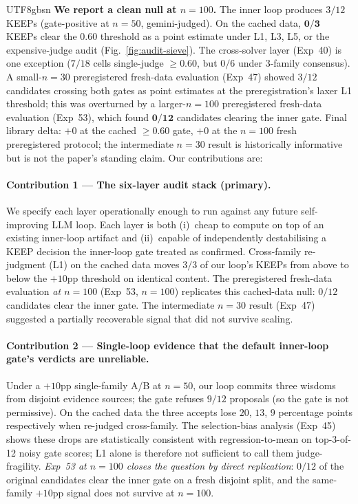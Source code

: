 \documentclass{article}
\begin{document}
\begin{CJK*}{UTF8}{gbsn}
\textbf{We report a clean null at \(n=100\).} The
inner loop produces \(3/12\) KEEPs (gate-positive at \(n=50\),
gemini-judged). On the cached data, \(\mathbf{0/3}\) KEEPs clear
the \(0.60\) threshold as a point estimate under L1, L3, L5, or
the expensive-judge audit (Fig.~\ref{fig:audit-sieve}). The
cross-solver layer (Exp~40) is one exception (\(7/18\) cells
single-judge \(\geq 0.60\), but \(0/6\) under 3-family consensus).
A small-\(n=30\) preregistered fresh-data evaluation (Exp~47)
showed \(3/12\) candidates crossing both gates as point estimates
at the preregistration's laxer L1 threshold; this was overturned
by a larger-\(n=100\) preregistered fresh-data evaluation
(Exp~53), which found \(\mathbf{0/12}\) candidates clearing the
inner gate. Final library delta: \(\boxed{+0}\) at the cached
\(\geq 0.60\) gate, \(\boxed{+0}\) at the \(n=100\) fresh
preregistered protocol; the intermediate \(n=30\) result is
historically informative but is not the paper's standing claim.
Our contributions are:

\paragraph{Contribution 1 — The six-layer audit stack (primary).} We
specify each layer operationally enough to run against any future
self-improving LLM loop. Each layer is both (i)~cheap to compute on
top of an existing inner-loop artifact and (ii)~capable of
independently destabilising a KEEP decision the inner-loop gate
treated as confirmed. Cross-family re-judgment (L1) on the cached
data moves \(3/3\) of our loop's KEEPs from above to below the
\(+10\)pp threshold on identical content. The preregistered
fresh-data evaluation \emph{at \(n=100\)} (Exp~53,
\(n=100\)) replicates this cached-data null: \(0/12\) candidates
clear the inner gate. The intermediate \(n=30\) result (Exp~47)
suggested a partially recoverable signal that did not survive
scaling.

\paragraph{Contribution 2 — Single-loop evidence that the default
inner-loop gate's verdicts are unreliable.} Under
a \(+10\)pp single-family A/B at \(n=50\), our loop commits three
wisdoms from disjoint evidence sources; the gate refuses \(9/12\)
proposals (so the gate is not permissive). On the cached data
the three accepts lose \(20\), \(13\), \(9\) percentage points
respectively when re-judged cross-family. The selection-bias
analysis (Exp~45) shows these drops are statistically consistent
with regression-to-mean on top-3-of-12 noisy gate scores; L1
alone is therefore not sufficient to call them judge-fragility.
\emph{Exp~53 at \(n=100\) closes the question by direct
replication}: \(0/12\) of the original candidates clear the
inner gate on a fresh disjoint split, and the same-family
\(+10\)pp signal does not survive at \(n=100\).


\end{CJK*}
\end{document}
